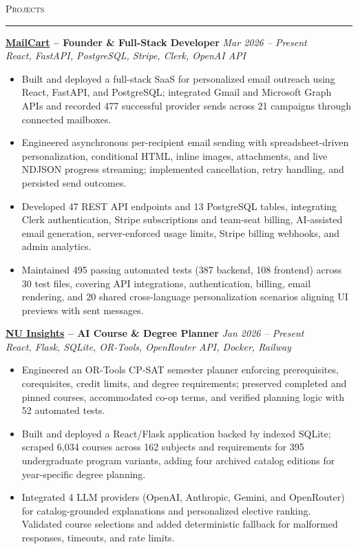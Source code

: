\documentclass[letterpaper,10pt]{article}
\newcommand{\header}[1]{\par\vspace{6pt}\textsc{#1}\par\nobreak\vspace{1pt}\hrule\vspace{4pt}}
\begin{document}
\header{Projects}
\textbf{\href{https://usemailcart.com}{MailCart} -- Founder \& Full-Stack Developer} \hfill \textit{Mar 2026 -- Present}\\
\textit{React, FastAPI, PostgreSQL, Stripe, Clerk, OpenAI API}\vspace{-2pt}
\begin{itemize}
  \item Built and deployed a full-stack SaaS for personalized email outreach using React, FastAPI, and PostgreSQL; integrated Gmail and Microsoft Graph APIs and recorded 477 successful provider sends across 21 campaigns through connected mailboxes.
  \item Engineered asynchronous per-recipient email sending with spreadsheet-driven personalization, conditional HTML, inline images, attachments, and live NDJSON progress streaming; implemented cancellation, retry handling, and persisted send outcomes.
  \item Developed 47 REST API endpoints and 13 PostgreSQL tables, integrating Clerk authentication, Stripe subscriptions and team-seat billing, AI-assisted email generation, server-enforced usage limits, Stripe billing webhooks, and admin analytics.
  \item Maintained 495 passing automated tests (387 backend, 108 frontend) across 30 test files, covering API integrations, authentication, billing, email rendering, and 20 shared cross-language personalization scenarios aligning UI previews with sent messages.
\end{itemize}
\vspace{2pt}
\textbf{\href{https://nuinsights.josephkelly.dev}{NU Insights} -- AI Course \& Degree Planner} \hfill \textit{Jan 2026 -- Present}\\
\textit{React, Flask, SQLite, OR-Tools, OpenRouter API, Docker, Railway}\vspace{-2pt}
\begin{itemize}
  \item Engineered an OR-Tools CP-SAT semester planner enforcing prerequisites, corequisites, credit limits, and degree requirements; preserved completed and pinned courses, accommodated co-op terms, and verified planning logic with 52 automated tests.
  \item Built and deployed a React/Flask application backed by indexed SQLite; scraped 6,034 courses across 162 subjects and requirements for 395 undergraduate program variants, adding four archived catalog editions for year-specific degree planning.
  \item Integrated 4 LLM providers (OpenAI, Anthropic, Gemini, and OpenRouter) for catalog-grounded explanations and personalized elective ranking. Validated course selections and added deterministic fallback for malformed responses, timeouts, and rate limits.
\end{itemize}
\end{document}
